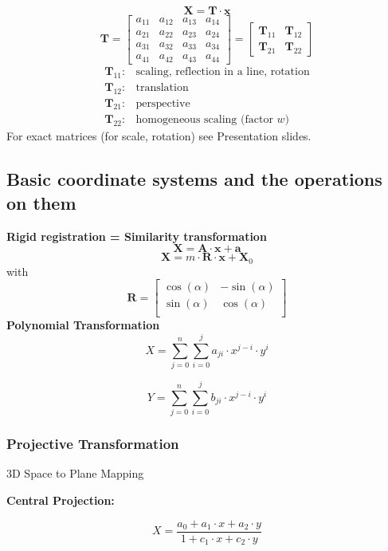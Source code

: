 \[
\mathbf{X} =\mathbf{T}\cdot \mathbf{x}
\]
\[
\mathbf{T} =
\left[
\begin{array}{ccc|c}
a_{11} & a_{12} & a_{13} & a_{14} \\
a_{21} & a_{22} & a_{23} & a_{24} \\
a_{31} & a_{32} & a_{33} & a_{34} \\
\hline
a_{41} & a_{42} & a_{43} & a_{44}
\end{array}
\right]
=
\begin{bmatrix}
\mathbf{T}_{11} & \mathbf{T}_{12} \\
\mathbf{T}_{21} & \mathbf{T}_{22}
\end{bmatrix}
\]
\[
\begin{array}{rl}
\mathbf{T}_{11} : & \text{scaling, reflection in a line, rotation} \\
\mathbf{T}_{12} : & \text{translation} \\
\mathbf{T}_{21} : & \text{perspective} \\
\mathbf{T}_{22} : & \text{homogeneous scaling (factor } w\text{)}
\end{array}
\]
For exact matrices (for scale, rotation) see Presentation slides.
\subsection{Basic coordinate systems and the operations on them}
\textbf{Rigid registration = Similarity transformation}
\[
\mathbf{X} = \mathbf{A} \cdot \mathbf{x} + \mathbf{a}
\]
\[
\mathbf{X} = m \cdot \mathbf{R} \cdot \mathbf{x} + \mathbf{X}_0
\]
with 
\[
\mathbf{R} =
\begin{bmatrix}
\cos(\alpha) & -\sin(\alpha) \\
\sin(\alpha) & \cos(\alpha) \\
\end{bmatrix}
\]
\textbf{Polynomial Transformation}
\[
X = \sum_{j=0}^{n} \sum_{i=0}^{j} a_{ji} \cdot x^{j-i} \cdot y^{i}
\]

\[
Y = \sum_{j=0}^{n} \sum_{i=0}^{j} b_{ji} \cdot x^{j-i} \cdot y^{i}
\]

\subsubsection{Projective Transformation}
3D Space to Plane Mapping

\textbf{Central Projection:}

\[
X = \frac{a_0 + a_1 \cdot x + a_2 \cdot y}{1 + c_1 \cdot x + c_2 \cdot y}
\]

